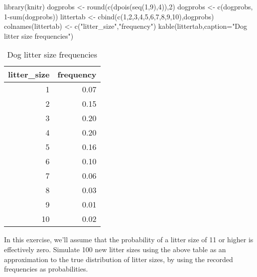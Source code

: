 \documentclass[
]{book}
\newenvironment{Shaded}{\begin{snugshade}}{\end{snugshade}}
\newcommand{\AttributeTok}[1]{\textcolor[rgb]{0.77,0.63,0.00}{#1}}
\newcommand{\DecValTok}[1]{\textcolor[rgb]{0.00,0.00,0.81}{#1}}
\newcommand{\FunctionTok}[1]{\textcolor[rgb]{0.00,0.00,0.00}{#1}}
\newcommand{\NormalTok}[1]{#1}
\newcommand{\OtherTok}[1]{\textcolor[rgb]{0.56,0.35,0.01}{#1}}
\newcommand{\SpecialCharTok}[1]{\textcolor[rgb]{0.00,0.00,0.00}{#1}}
\newcommand{\StringTok}[1]{\textcolor[rgb]{0.31,0.60,0.02}{#1}}
\begin{document}
\begin{Shaded}
\begin{Highlighting}[]
\FunctionTok{library}\NormalTok{(knitr)}
\NormalTok{dogprobs }\OtherTok{\textless{}{-}} \FunctionTok{round}\NormalTok{(}\FunctionTok{c}\NormalTok{(}\FunctionTok{dpois}\NormalTok{(}\FunctionTok{seq}\NormalTok{(}\DecValTok{1}\NormalTok{,}\DecValTok{9}\NormalTok{),}\DecValTok{4}\NormalTok{)),}\DecValTok{2}\NormalTok{)}
\NormalTok{dogprobs }\OtherTok{\textless{}{-}} \FunctionTok{c}\NormalTok{(dogprobs, }\DecValTok{1}\SpecialCharTok{{-}}\FunctionTok{sum}\NormalTok{(dogprobs))}
\NormalTok{littertab }\OtherTok{\textless{}{-}} \FunctionTok{cbind}\NormalTok{(}\FunctionTok{c}\NormalTok{(}\DecValTok{1}\NormalTok{,}\DecValTok{2}\NormalTok{,}\DecValTok{3}\NormalTok{,}\DecValTok{4}\NormalTok{,}\DecValTok{5}\NormalTok{,}\DecValTok{6}\NormalTok{,}\DecValTok{7}\NormalTok{,}\DecValTok{8}\NormalTok{,}\DecValTok{9}\NormalTok{,}\DecValTok{10}\NormalTok{),dogprobs)}
\FunctionTok{colnames}\NormalTok{(littertab) }\OtherTok{\textless{}{-}} \FunctionTok{c}\NormalTok{(}\StringTok{"litter\_size"}\NormalTok{,}\StringTok{"frequency"}\NormalTok{)}
\FunctionTok{kable}\NormalTok{(littertab,}\AttributeTok{caption=}\StringTok{"Dog litter size frequencies"}\NormalTok{)}
\end{Highlighting}
\end{Shaded}

\begin{table}

\caption{\label{tab:unnamed-chunk-24}Dog litter size frequencies}
\centering
\begin{tabular}[t]{r|r}
\hline
litter\_size & frequency\\
\hline
1 & 0.07\\
\hline
2 & 0.15\\
\hline
3 & 0.20\\
\hline
4 & 0.20\\
\hline
5 & 0.16\\
\hline
6 & 0.10\\
\hline
7 & 0.06\\
\hline
8 & 0.03\\
\hline
9 & 0.01\\
\hline
10 & 0.02\\
\hline
\end{tabular}
\end{table}

In this exercise, we'll assume that the probability of a litter size of 11 or higher is effectively zero. Simulate 100 new litter sizes using the above table as an approximation to the true distribution of litter sizes, by using the recorded frequencies as probabilities.
\end{document}
